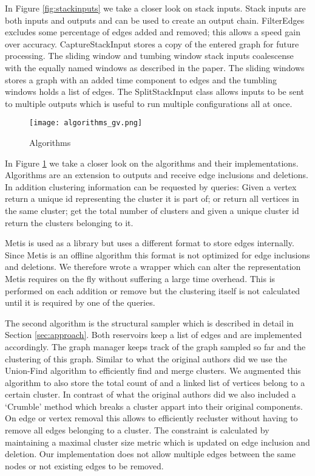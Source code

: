 \documentclass[a4paper]{article}
\begin{document}
In Figure \ref{fig:stackinputs} we take a closer look on stack inputs. Stack inputs are both inputs and outputs and can be used to create an output chain. FilterEdges excludes some percentage of edges added and removed; this allows a speed gain over accuracy. CaptureStackInput stores a copy of the entered graph for future processing. The sliding window and tumbing window stack inputs coalescense with the equally named windows as described in the paper. The sliding windows stores a graph with an added time component to edges and the tumbling windows holds a list of edges. The SplitStackInput class allows inputs to be sent to multiple outputs which is useful to run multiple configurations all at once.

\begin{figure}[h]
\centering
\texttt{[image: algorithms\_gv.png]}
\caption{\label{fig:algorithms}Algorithms}
\end{figure}

\pagebreak

In Figure \ref{fig:algorithms} we take a closer look on the algorithms and their implementations. Algorithms are an extension to outputs and receive edge inclusions and deletions. In addition clustering information can be requested by queries: Given a vertex return a unique id representing the cluster it is part of; or return all vertices in the same cluster; get the total number of clusters and given a unique cluster id return the clusters belonging to it.

Metis is used as a library but uses a different format to store edges internally. Since Metis is an offline algorithm this format is not optimized for edge inclusions and deletions. We therefore wrote a wrapper which can alter the representation Metis requires on the fly without suffering a large time overhead. This is performed on each addition or remove but the clustering itself is not calculated until it is required by one of the queries.

The second algorithm is the structural sampler which is described in detail in Section \ref{sec:approach}. Both reservoirs keep a list of edges and are implemented accordingly. The graph manager keeps track of the graph sampled so far and the clustering of this graph. Similar to what the original authors did we use the Union-Find algorithm to efficiently find and merge clusters. We augmented this algorithm to also store the total count of and a linked list of vertices belong to a certain cluster. In contrast of what the original authors did we also included a `Crumble' method which breaks a cluster appart into their original components. On edge or vertex removal this allows to efficiently recluster without having to remove all edges belonging to a cluster. The constraint is calculated by maintaining a maximal cluster size metric which is updated on edge inclusion and deletion. Our implementation does not allow multiple edges between the same nodes or not existing edges to be removed.
\end{document}
